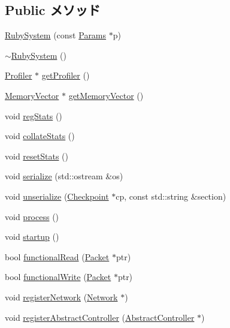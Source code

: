 \subsection*{Public メソッド}
\begin{DoxyCompactItemize}
\item 
\hyperlink{classRubySystem_a84ecac2914c133c0db81fe28405e815b}{RubySystem} (const \hyperlink{classRubySystem_af3998ceb414058e5e416b8b239698858}{Params} $\ast$p)
\item 
\hyperlink{classRubySystem_a335c948aafcd4d981ba75e02f1b33500}{$\sim$RubySystem} ()
\item 
\hyperlink{classProfiler}{Profiler} $\ast$ \hyperlink{classRubySystem_a1dc2a271b826284445c889f60c62b2fb}{getProfiler} ()
\item 
\hyperlink{classMemoryVector}{MemoryVector} $\ast$ \hyperlink{classRubySystem_aae1baebbd770dbbcf63259f5053681ea}{getMemoryVector} ()
\item 
void \hyperlink{classRubySystem_a4dc637449366fcdfc4e764cdf12d9b11}{regStats} ()
\item 
void \hyperlink{classRubySystem_a208669cbc0bb1d52565956ca8c690c55}{collateStats} ()
\item 
void \hyperlink{classRubySystem_a65880e61108132689a1bd769b9187fb7}{resetStats} ()
\item 
void \hyperlink{classRubySystem_a53e036786d17361be4c7320d39c99b84}{serialize} (std::ostream \&os)
\item 
void \hyperlink{classRubySystem_af22e5d6d660b97db37003ac61ac4ee49}{unserialize} (\hyperlink{classCheckpoint}{Checkpoint} $\ast$cp, const std::string \&section)
\item 
void \hyperlink{classRubySystem_a2e9c5136d19b1a95fc427e0852deab5c}{process} ()
\item 
void \hyperlink{classRubySystem_aecc7d8debf54990ffeaaed5bac7d7d81}{startup} ()
\item 
bool \hyperlink{classRubySystem_a9fece07bc06f16d7c5190f08e42f5359}{functionalRead} (\hyperlink{classPacket}{Packet} $\ast$ptr)
\item 
bool \hyperlink{classRubySystem_af751326b50cd1150f91ec688d9336ffc}{functionalWrite} (\hyperlink{classPacket}{Packet} $\ast$ptr)
\item 
void \hyperlink{classRubySystem_ac1a2d2ecf9164e8b3e11b461abab8521}{registerNetwork} (\hyperlink{classNetwork}{Network} $\ast$)
\item 
void \hyperlink{classRubySystem_ab7d5364ddbfcfd86ca9a47684f12c162}{registerAbstractController} (\hyperlink{classAbstractController}{AbstractController} $\ast$)

\end{DoxyCompactItemize}
